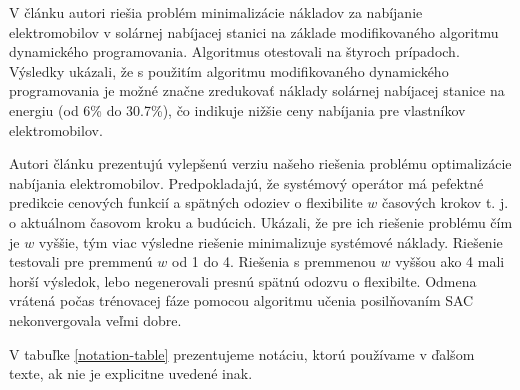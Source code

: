 V  článku \cite{ev-charging-cost-minimization-modified-DP} autori riešia problém minimalizácie nákladov za nabíjanie elektromobilov v solárnej nabíjacej stanici na základe modifikovaného algoritmu dynamického programovania. Algoritmus otestovali na štyroch prípadoch. Výsledky ukázali, že s použitím algoritmu modifikovaného dynamického programovania je možné značne zredukovať náklady solárnej nabíjacej stanice na energiu (od 6\% do 30.7\%), čo indikuje nižšie ceny nabíjania pre vlastníkov elektromobilov. 


Autori článku \cite{Li_information_aggregation} prezentujú vylepšenú verziu našeho riešenia problému optimalizácie nabíjania elektromobilov. Predpokladajú, že systémový operátor má pefektné predikcie cenových funkcií a spätných odoziev o flexibilite $w$ časových krokov t. j. o aktuálnom časovom kroku a budúcich. Ukázali, že pre ich riešenie problému čím je $w$ vyššie, tým viac výsledne riešenie minimalizuje systémové náklady. Riešenie testovali pre premmenú $w$ od 1 do 4. Riešenia s premmenou $w$ vyššou ako 4 mali horší výsledok, lebo negenerovali presnú spätnú odozvu o flexibilte. Odmena vrátená počas trénovacej fáze pomocou algoritmu učenia posilňovaním SAC nekonvergovala veľmi dobre.   



V tabuľke \ref{notation-table} prezentujeme notáciu, ktorú používame v ďalšom texte, ak nie je explicitne uvedené inak.












